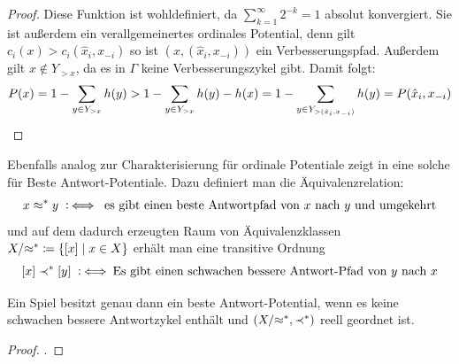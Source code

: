 \begin{proof}
	Diese Funktion ist wohldefiniert, da $\sum_{k=1}^{\infty} 2^{-k} = 1$ absolut konvergiert. Sie ist außerdem ein verallgemeinertes ordinales Potential, denn gilt $c_i(x) > c_i(\hat{x}_i, x_{-i})$ so ist $(x, (\hat{x}_i, x_{-i}))$ ein Verbesserungspfad. Außerdem gilt $x \notin Y_{>x}$, da es in $\Gamma$ keine Verbesserungszykel gibt. Damit folgt:
		\[P(x) = 1 - \sum_{y \in Y_{>x}} h(y) > 1 - \sum_{y \in Y_{>x}} h(y) - h(x) = 1 - \sum_{y \in Y_{>(\hat{x}_i, x_{-i})}}h(y) = P(\hat{x}_i, x_{-i})\qedhere\]
\end{proof}


Ebenfalls analog zur Charakterisierung für ordinale Potentiale zeigt \citeauthor{BestRespPot} in \cite[Theorem 3.1]{BestRespPot} eine solche für Beste Antwort-Potentiale. Dazu definiert man die Äquivalenzrelation:
	\[x \approx^\ast y \mathbin{~\mathop:\!\!\iff} \text{ es gibt einen beste Antwortpfad von $x$ nach $y$ und umgekehrt}\]
und auf dem dadurch erzeugten Raum von Äquivalenzklassen $X/{\approx^\ast} \coloneqq \left\lbrace[x] \mid x \in X\right\rbrace$ erhält man eine transitive Ordnung
\[[x] \prec^\ast [y] \mathbin{~\mathop:\!\!\iff} \text{Es gibt einen schwachen bessere Antwort-Pfad von $y$ nach $x$}\]

\begin{satz}
	Ein Spiel besitzt genau dann ein beste Antwort-Potential, wenn es keine schwachen bessere Antwortzykel enthält und $(X/{\approx^\ast}, \prec^\ast)$ reell geordnet ist.
\end{satz}

\begin{proof}.
	
\end{proof}